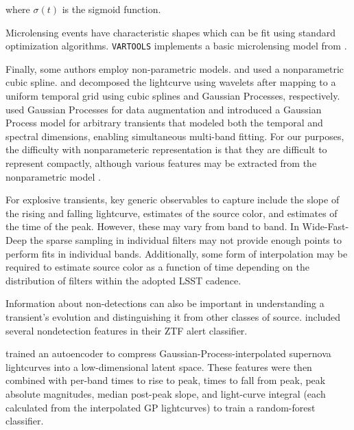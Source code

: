 \documentclass[DM,authoryear,toc]{lsstdoc}
\begin{document}
where $\sigma(t)$ is the sigmoid function.


Microlensing events have characteristic shapes which can be fit using standard optimization algorithms.
\texttt{VARTOOLS} implements a basic microlensing model from \citet{Wozniak:01:Microlensing}.

Finally, some authors employ non-parametric models.
\citet{Richards:12:SemiSupervisedSNe} and \citet{Ishida:13:PCASNClassification} used a nonparametric cubic spline.
\citet{Varughese:15:SNPhotCC} and \citet{Lochner:16:SNPhotCC} decomposed the lightcurve using wavelets after mapping to a uniform temporal grid using cubic splines and Gaussian Processes, respectively.
\citet{Revsbech:18:SNGP} used Gaussian Processes for data augmentation and \citet{Boone:19:AvocadoClassifier} introduced a Gaussian Process model for arbitrary transients that modeled both the temporal and spectral dimensions, enabling simultaneous multi-band fitting.
For our purposes, the difficulty with nonparameteric representation is that they are difficult to represent compactly, although various features may be extracted from the nonparametric model \citep[e.g.,][]{Boone:19:AvocadoClassifier}.

For explosive transients, key generic observables to capture include the slope of the rising and falling lightcurve, estimates of the source color, and estimates of the time of the peak.
However, these may vary from band to band.
In Wide-Fast-Deep the sparse sampling in individual filters may not provide enough points to perform fits in individual bands.
Additionally, some form of interpolation may be required to estimate source color as a function of time depending on the distribution of filters within the adopted LSST cadence.

Information about non-detections can also be important in understanding a transient's evolution and distinguishing it from other classes of source.
\citet{Sanchez-Saez:21:AlertClassification} included several nondetection features in their ZTF alert classifier.

\citet{Villar:20:SuperRAENN} trained an autoencoder to compress Gaussian-Process-interpolated supernova lightcurves into a low-dimensional latent space.
These features were then combined with per-band times to rise to peak, times to fall from peak, peak absolute magnitudes, median post-peak slope, and light-curve integral (each calculated from the interpolated GP lightcurves) to train a random-forest classifier.
\end{document}
